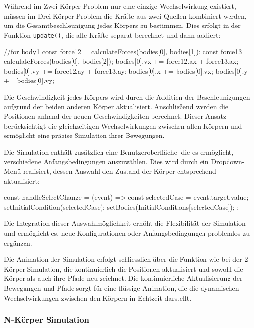 \documentclass[a4paper,12pt,twoside]{article}
\begin{document}
Während im Zwei-Körper-Problem nur eine einzige Wechselwirkung existiert, müssen im Drei-Körper-Problem die Kräfte aus zwei Quellen kombiniert werden, um die Gesamtbeschleunigung jedes Körpers zu bestimmen. Dies erfolgt in der Funktion \texttt{update()}, die alle Kräfte separat berechnet und dann addiert:

\begin{javascript}
//for body1
const force12 = calculateForces(bodies[0], bodies[1]);
const force13 = calculateForces(bodies[0], bodies[2]);
bodies[0].vx += force12.ax + force13.ax;
bodies[0].vy += force12.ay + force13.ay;
bodies[0].x += bodies[0].vx;
bodies[0].y += bodies[0].vy;
\end{javascript}

Die Geschwindigkeit jedes Körpers wird durch die Addition der Beschleunigungen aufgrund der beiden anderen Körper aktualisiert. Anschließend werden die Positionen anhand der neuen Geschwindigkeiten berechnet. Dieser Ansatz berücksichtigt die gleichzeitigen Wechselwirkungen zwischen allen Körpern und ermöglicht eine präzise Simulation ihrer Bewegungen.


Die Simulation enthält zusätzlich eine Benutzeroberfläche, die es ermöglicht, verschiedene Anfangsbedingungen auszuwählen. Dies wird durch ein Dropdown-Menü realisiert, dessen Auswahl den Zustand der Körper entsprechend aktualisiert:

\begin{javascript}
const handleSelectChange = (event) => {
    const selectedCase = event.target.value;
    setInitialCondition(selectedCase);
    setBodies(InitialConditions[selectedCase]);
};
\end{javascript}

Die Integration dieser Auswahlmöglichkeit erhöht die Flexibilität der Simulation und ermöglicht es, neue Konfigurationen oder Anfangsbedingungen problemlos zu ergänzen.

Die Animation der Simulation erfolgt schliesslich über die Funktion  wie bei der 2-Körper Simulation, die kontinuierlich die Positionen aktualisiert und sowohl die Körper als auch ihre Pfade neu zeichnet. Die kontinuierliche Aktualisierung der Bewegungen und Pfade sorgt für eine flüssige Animation, die die dynamischen Wechselwirkungen zwischen den Körpern in Echtzeit darstellt.

\subsubsection{N-Körper Simulation}
\end{document}
